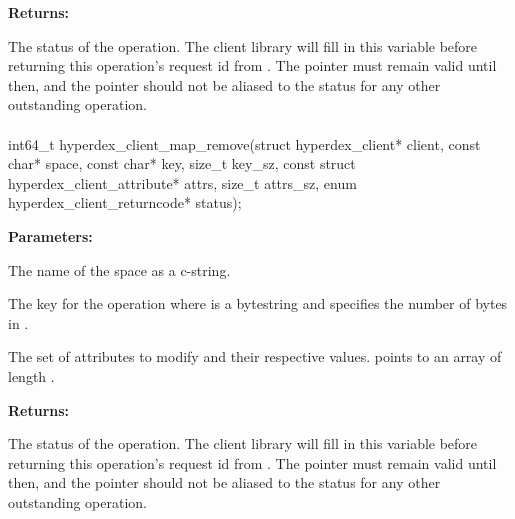 \noindent\textbf{Returns:}
\begin{description}[labelindent=\widthof{{\code{status}}},leftmargin=*,noitemsep,nolistsep,align=right]
\item[\code{status}] The status of the operation.  The client library will fill in this variable before returning this operation's request id from .  The pointer must remain valid until then, and the pointer should not be aliased to the status for any other outstanding operation.
\end{description}

\paragraph{}
\label{api:c:map_remove}
\begin{ccode}
int64_t hyperdex_client_map_remove(struct hyperdex_client* client,
        const char* space,
        const char* key, size_t key_sz,
        const struct hyperdex_client_attribute* attrs, size_t attrs_sz,
        enum hyperdex_client_returncode* status);
\end{ccode}
\funcdesc 

\noindent\textbf{Parameters:}
\begin{description}[labelindent=\widthof{{\code{attrs}, \code{attrs\_sz}}},leftmargin=*,noitemsep,nolistsep,align=right]
\item[\code{space}] The name of the space as a c-string.
\item[\code{key}, \code{key\_sz}] The key for the operation where  is a bytestring and  specifies the number of bytes in .
\item[\code{attrs}, \code{attrs\_sz}] The set of attributes to modify and their respective values.   points to an array of length .
\end{description}

\noindent\textbf{Returns:}
\begin{description}[labelindent=\widthof{{\code{status}}},leftmargin=*,noitemsep,nolistsep,align=right]
\item[\code{status}] The status of the operation.  The client library will fill in this variable before returning this operation's request id from .  The pointer must remain valid until then, and the pointer should not be aliased to the status for any other outstanding operation.
\end{description}

